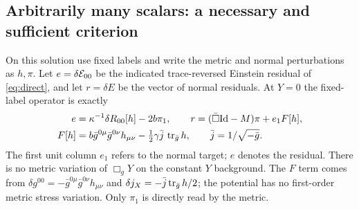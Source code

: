 \subsection{Arbitrarily many scalars: a necessary and sufficient criterion}
On this solution use fixed labels and write the metric and normal perturbations as \(h,\pi\). Let \(e=\delta{\cal E}_{00}\) be the indicated trace-reversed Einstein residual of \eqref{eq:direct}, and let \(r=\delta E\) be the vector of normal residuals. At \(Y=0\) the fixed-label operator is exactly
\begin{align}
 e&=\kappa^{-1}\delta R_{00}[h]-2b\pi_1,\qquad
 r=(\bar\Box\mathrm{Id}-M)\pi+e_1 F[h], \label{eq:resclass}\\
 F[h]&=b\bar g^{0\mu}\bar g^{0\nu}h_{\mu\nu}
                   -\tfrac12\gamma\bar j\,\operatorname{tr}_{\bar g}h,\qquad
 \bar j=1/\sqrt{-\bar g}. \nonumber
\end{align}
The first unit column \(e_1\) refers to the normal target; \(e\) denotes the residual. There is no metric variation of \(\Box_gY\) on the constant \(Y\) background. The \(F\) term comes from \(\delta g^{00}=-\bar g^{0\mu}\bar g^{0\nu}h_{\mu\nu}\) and \(\delta j_X=-\bar j\operatorname{tr}_{\bar g}h/2\); the potential has no first-order metric stress variation. Only \(\pi_1\) is directly read by the metric.

